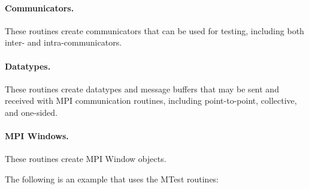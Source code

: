 \paragraph{Communicators.}
These routines create communicators that can be used for testing,
including both inter- and intra-communicators.

\paragraph{Datatypes.}
These routines create datatypes and message buffers that may be sent
and received with MPI communication routines, including
point-to-point, collective, and one-sided.  

\paragraph{MPI Windows.}
These routines create MPI Window objects.

The following is an example that uses the MTest routines:

